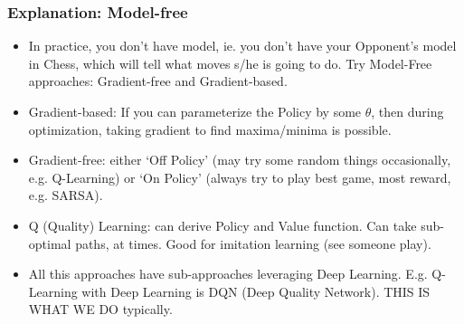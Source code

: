 \begin{frame}[fragile]\frametitle{Explanation: Model-free}

\begin{itemize}
\item In practice, you don't have model, ie. you don't have your Opponent's model in Chess, which will tell what moves s/he is going to do. Try Model-Free approaches: Gradient-free and Gradient-based.
\item Gradient-based: If you can parameterize the Policy by some $\theta$, then during optimization, taking gradient to find maxima/minima is possible.
\item Gradient-free: either `Off Policy' (may try some random things occasionally, e.g. Q-Learning) or `On Policy' (always try to play best game, most reward, e.g. SARSA). 
\item Q (Quality) Learning: can derive Policy and Value function. Can take sub-optimal paths, at times. Good for imitation learning (see someone play). 
\item All this approaches have sub-approaches leveraging Deep Learning. E.g. Q-Learning with Deep Learning is DQN (Deep Quality Network). THIS IS WHAT WE DO typically.
\end{itemize}

\end{frame}



